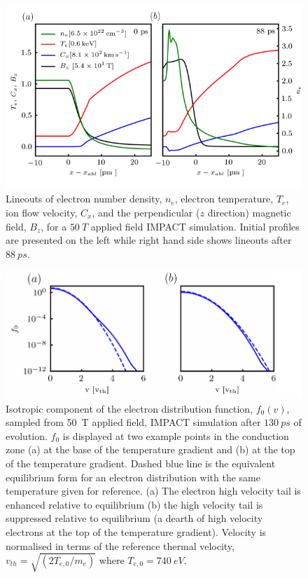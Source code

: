 \documentclass[aip,reprint]{revtex4-1}
\begin{document}
\begin{figure}
\includegraphics[width=1.0\columnwidth]{pics/one_dim_2col15.png}%
\caption{\label{fig:1Dprof} Lineouts of electron number density, $n_e$, electron temperature, $T_e$, ion flow velocity, $C_x$, and the perpendicular ($z$ direction) magnetic field, $B_z$, for a $\SI{50}{T}$ applied field IMPACT simulation. Initial profiles are presented on the left while right hand side shows lineouts after $\SI{88}{ps}$. }%
\end{figure}

\begin{figure}
	\includegraphics[width=1.0\columnwidth]{pics/f0_50T_LT1_noTe.pdf}%
	\caption{\label{fig:f0prof} Isotropic component of the electron distribution function, $f_0(v)$, sampled from \SI{50}{T} applied field, IMPACT simulation after $\SI{130}{ps}$ of evolution. $f_0$ is displayed at two example points in the conduction zone  (a) at the base of the temperature gradient and (b) at the top of the temperature gradient. Dashed blue line is the equivalent equilibrium form for an electron distribution with the same temperature given for reference. (a) The electron high velocity tail is enhanced relative to equilibrium (b) the high velocity tail is suppressed relative to equilibrium (a dearth of high velocity electrons at the top of the temperature gradient).   Velocity is normalised in terms of the reference thermal velocity, $v_{th}= \sqrt{(2 T_{e,0}/m_e)}$ where $T_{e,0}= \SI{740}{eV}$.} %
\end{figure}
\end{document}
